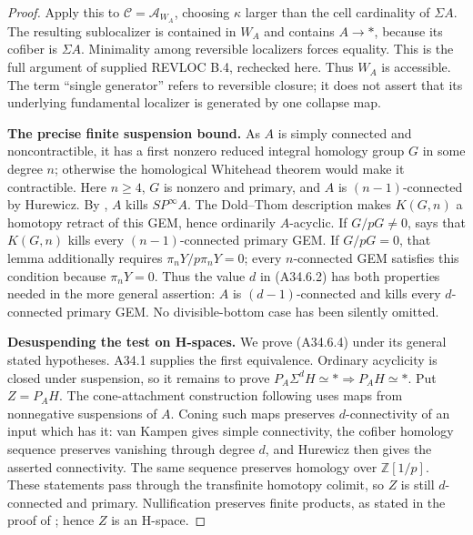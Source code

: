 \begin{proof}
Apply this to $\mathcal C=\mathcal A_{W_A}$, choosing $\kappa$
larger than the cell cardinality of $\Sigma A$.
The resulting sublocalizer is contained in $W_A$ and contains
$A\to *$, because its cofiber is $\Sigma A$.
Minimality among reversible localizers forces equality.
This is the full argument of supplied REVLOC B.4, rechecked here.
Thus $W_A$ is accessible.  The term ``single generator'' refers
to reversible closure; it does not assert that its underlying
fundamental localizer is generated by one collapse map.

\par\medskip\noindent\textbf{The precise finite suspension bound.}\quad
As $A$ is simply connected and noncontractible, it has a first
nonzero reduced integral homology group $G$ in some degree $n$;
otherwise the homological Whitehead theorem would make it
contractible.  Here $n\geq4$, $G$ is nonzero and primary, and
$A$ is $(n-1)$-connected by Hurewicz.
By \citet[Corollary~3.2(ii)]{ABousfield1996}, $A$ kills
$SP^\infty A$.  The Dold--Thom description makes $K(G,n)$ a
homotopy retract of this GEM, hence ordinarily $A$-acyclic.
If $G/pG\ne0$, \citet[Lemma~8.13]{ABousfield1997} says that
$K(G,n)$ kills every $(n-1)$-connected primary GEM.
If $G/pG=0$, that lemma additionally requires
$\pi_nY/p\pi_nY=0$; every $n$-connected GEM satisfies this
condition because $\pi_nY=0$.
Thus the value $d$ in \textup{(A34.6.2)} has both properties
needed in the more general assertion: $A$ is $(d-1)$-connected
and kills every $d$-connected primary GEM.  No divisible-bottom
case has been silently omitted.

\par\medskip\noindent\textbf{Desuspending the test on H-spaces.}\quad
We prove \textup{(A34.6.4)} under its general stated hypotheses.
A34.1 supplies the first equivalence.  Ordinary acyclicity is
closed under suspension, so it remains to prove
$P_A\Sigma^dH\simeq *\Rightarrow P_AH\simeq *$.
Put $Z=P_AH$.
The cone-attachment construction following
\citet[Theorem~1.1]{ABousfield1996} uses maps from nonnegative
suspensions of $A$.  Coning such maps preserves $d$-connectivity
of an input which has it: van Kampen gives simple connectivity,
the cofiber homology sequence preserves vanishing through degree
$d$, and Hurewicz then gives the asserted connectivity.
The same sequence preserves homology over $\mathbb Z[1/p]$.
These statements pass through the transfinite homotopy colimit,
so $Z$ is still $d$-connected and primary.
Nullification preserves finite products, as stated in the proof
of \citet[Theorem~1.7]{ABousfield1996}; hence $Z$ is an H-space.


\end{proof}
